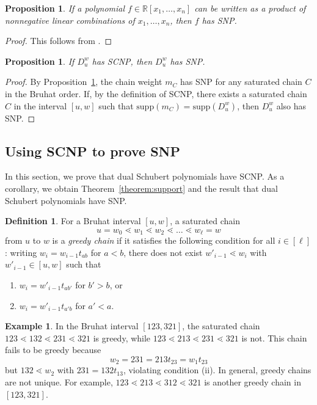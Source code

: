 \documentclass[11pt]{article}
\newtheorem{prop}[theo]{Proposition}
\theoremstyle{definition}
\newtheorem{defi}[theo]{Definition}
\newtheorem{exam}[theo]{Example}
\numberwithin{equation}{section}
\newcommand{\R}{\mathbb{R}}
\newcommand{\supp}{\mathrm{supp}}
\begin{document}
\begin{prop}\label{prop:linearprodSNP}
    If a polynomial $f\in \R[x_1,\dots,x_n]$ can be written as a product of nonnegative linear combinations of $x_1, \dots, x_n$, then $f$ has SNP.
\end{prop}

\begin{proof}
    This follows from \cite[Theorem 3.4]{2009minkowski}.
\end{proof}


\begin{prop}\label{prop:SCNPtoSNP}
    If $D_u^w$ has SCNP, then $D_u^w$ has SNP.
\end{prop}
\begin{proof}
    By Proposition~\ref{prop:linearprodSNP}, the chain weight $m_C$ has SNP for any saturated chain $C$ in the Bruhat order. If, by the definition of SCNP, there exists a saturated chain $C$ in the interval $[u, w]$ such that $\supp(m_C) = \supp(D_u^w)$, then $D_u^w$ also has SNP.
\end{proof}



\subsection{Using SCNP to prove SNP}\label{subsec:dualschubSCNP}

In this section, we prove that dual Schubert polynomials have SCNP. As a corollary, we obtain Theorem~\ref{theorem:support} and the result that dual Schubert polynomials have SNP. 

\begin{defi}
    For a Bruhat interval $[u,w]$, a saturated chain 
    \[u = w_0\lessdot w_1\lessdot w_2\lessdot \dots \lessdot w_{\ell} = w\] 
    from $u$ to $w$ is a \emph{greedy chain} if it satisfies the following condition for all $i\in [\ell]$: writing $w_{i}=w_{i-1}t_{ab}$ for $a < b$, there does not exist $w'_{i-1}\lessdot w_{i}$ with $w'_{i-1} \in [u,w]$ such that 
    \begin{enumerate}[label=\textnormal{(\roman*)}]
        \item $w_{i}=w'_{i-1}t_{ab'}$ for $b'>b$, or
        \item $w_{i}=w'_{i-1}t_{a'b}$ for $a'<a$.
    \end{enumerate}
\end{defi}

\begin{exam}
    In the Bruhat interval $[123, 321]$, the saturated chain $123 \lessdot 132\lessdot 231 \lessdot 321$ is greedy, while $123 \lessdot 213 \lessdot 231 \lessdot 321$ is not. This chain fails to be greedy because \[w_2 = 231 = 213t_{23} = w_{1}t_{23}\] but $132 \lessdot w_2$ with $231 = 132t_{13}$, violating condition (ii). In general, greedy chains are not unique. For example, $123 \lessdot 213 \lessdot 312 \lessdot 321$ is another greedy chain in $[123,321]$.
\end{exam}
\end{document}
